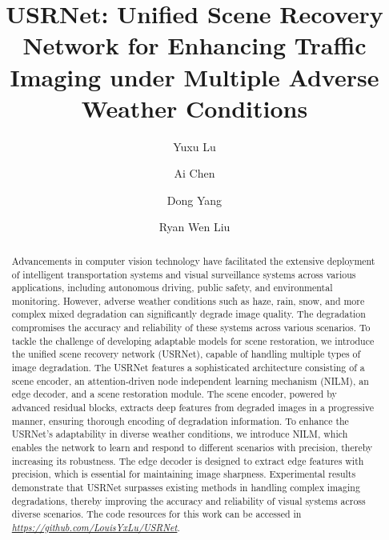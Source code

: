 \documentclass[final,12pt]{elsarticle}
\begin{document}
%
\begin{frontmatter}

\title{USRNet: Unified Scene Recovery Network for Enhancing Traffic Imaging under Multiple Adverse Weather Conditions}
%
\author[1]{Yuxu Lu}
%
\author[2]{Ai Chen}
%
\author[1]{Dong Yang}
%
\author[3]{Ryan Wen Liu}
%
%
%
%
\begin{abstract}
    Advancements in computer vision technology have facilitated the extensive deployment of intelligent transportation systems and visual surveillance systems across various applications, including autonomous driving, public safety, and environmental monitoring. However, adverse weather conditions such as haze, rain, snow, and more complex mixed degradation can significantly degrade image quality. The degradation compromises the accuracy and reliability of these systems across various scenarios. To tackle the challenge of developing adaptable models for scene restoration, we introduce the unified scene recovery network (USRNet), capable of handling multiple types of image degradation. The USRNet features a sophisticated architecture consisting of a scene encoder, an attention-driven node independent learning mechanism (NILM), an edge decoder, and a scene restoration module. The scene encoder, powered by advanced residual blocks, extracts deep features from degraded images in a progressive manner, ensuring thorough encoding of degradation information. To enhance the USRNet's adaptability in diverse weather conditions, we introduce NILM, which enables the network to learn and respond to different scenarios with precision, thereby increasing its robustness. The edge decoder is designed to extract edge features with precision, which is essential for maintaining image sharpness. Experimental results demonstrate that USRNet surpasses existing methods in handling complex imaging degradations, thereby improving the accuracy and reliability of visual systems across diverse scenarios. The code resources for this work can be accessed in \textit{\url{https://github.com/LouisYxLu/USRNet}}.

\end{abstract}
\end{frontmatter}
\end{document}
